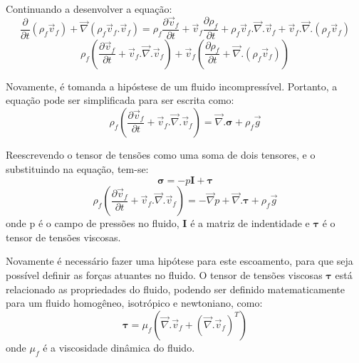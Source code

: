 Continuando a desenvolver a equação:
\begin{equation}
    \dfrac{\partial}{\partial t} (\rho_f \vec{v}_f) + 
    \vec{\nabla}(\rho_f \vec{v}_f.\vec{v}_f) =
    \rho_f \dfrac{\partial \vec{v}_f}{\partial t} + 
    \vec{v}_f \dfrac{\partial \rho_f}{\partial t} + 
    \rho_f \vec{v}_f.\vec{\nabla}.\vec{v}_f +
    \vec{v}_f.\vec{\nabla}.(\rho_f \vec{v}_f)
    \label{cons_qmov_ini}
\end{equation}
\begin{equation}
    \rho_f \left(
    	\dfrac{\partial \vec{v}_f}{\partial t} +
    	\vec{v}_f.\vec{\nabla}.\vec{v}_f 
	\right) +
	\vec{v}_f \left(
    	\dfrac{\partial \rho_f}{\partial t} +
    	\vec{\nabla}.(\rho_f \vec{v}_f)
	\right)
    \label{cons_qmov_mid}
\end{equation}

Novamente, é tomanda a hipóstese de um fluido incompressível.
Portanto, a equação pode ser simplificada para ser escrita como:
\begin{equation}
    \rho_f \left(
    	\dfrac{\partial \vec{v}_f}{\partial t} + 
    	\vec{v}_f.\vec{\nabla}.\vec{v}_f
	\right) =
    \vec{\nabla}.\boldsymbol{\sigma} +
    \rho_f \vec{g}
    \label{cons_qmov_fin}
\end{equation}

Reescrevendo o tensor de tensões como uma soma de dois tensores, e o substituindo na equação, tem-se:
\begin{equation}
    \boldsymbol{\sigma} = -p\mathbf{I} + \boldsymbol{\tau}
    \label{sigma}
\end{equation}
\begin{equation}
    \rho_f \left(
    	\dfrac{\partial \vec{v}_f}{\partial t} + 
    	\vec{v}_f.\vec{\nabla}.\vec{v}_f
	\right) =
    -\vec{\nabla}p +
    \vec{\nabla}.\boldsymbol{\tau} +
    \rho_f \vec{g}
    \label{cons_qmov_tensor}
\end{equation}
onde p é o campo de pressões no fluido, $\mathbf{I}$ é a matriz de indentidade e $\boldsymbol{\tau}$ é o tensor de tensões viscosas.

Novamente é necessário fazer uma hipótese para este escoamento, para que seja possível definir as forças atuantes no fluido. 
O tensor de tensões viscosas $\boldsymbol{\tau}$ está relacionado as propriedades do fluido, podendo ser definido matematicamente para um fluido homogêneo, isotrópico e newtoniano, como:
\begin{equation}
    \boldsymbol{\tau} = \mu_f\left(\vec{\nabla}.\vec{v}_f + \left(\vec{\nabla}.\vec{v}_f \right)^T \right)
    \label{tau}
\end{equation}
onde $\mu_f$ é a viscosidade dinâmica do fluido.

